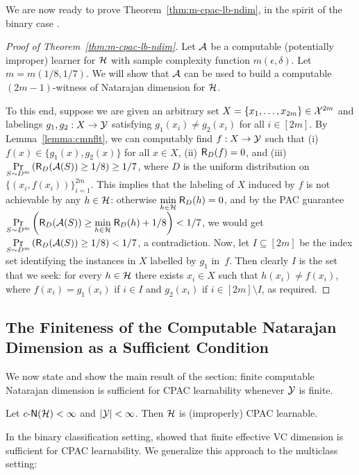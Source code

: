 \documentclass[11pt]{article}
\begin{document}
We are now ready to prove Theorem~\ref{thm:m-cpac-lb-ndim}, in the spirit of the binary case \citep{sterkenburg2022characterizations}.

\begin{proof}[Proof of Theorem~\ref{thm:m-cpac-lb-ndim}]
    Let $\mathcal{A}$ be a computable (potentially improper) learner for $\mathcal{H}$ with sample complexity function $m(\epsilon,\delta)$.
    Let $m=m(1/8,1/7)$.
    We will show that $\mathcal{A}$ can be used to build a computable $(2m-1)$-witness of Natarajan dimension for $\mathcal{H}$.
    
    To this end, suppose we are given an arbitrary set  $X=\{x_1,\dots,x_{2m}\}\in\mathcal{X}^{2m}$ and labelings $g_1,g_2:X\rightarrow\mathcal{Y}$  satisfying $g_1(x_i)\neq g_2(x_i)$ for all $i\in [2m]$.
    By Lemma~\ref{lemma:cmnflt}, we can computably find $f:X\rightarrow\mathcal{Y}$ such that (i) $f(x)\in\{g_1(x),g_2(x)\}$ for all $x\in X$, (ii) $\mathsf{R}_{D}(f)=0$, and (iii) $\underset{{S\sim D^m}}{\Pr}\left(\mathsf{R}_D(\mathcal{A}(S))\geq 1/8\right)\geq 1/7$,
    where $D$ is the uniform distribution on $\{(x_i, f(x_i))\}_{i=1}^{2m}$.
    This implies that the labeling of $X$ induced by $f$ is not achievable by any $h\in\mathcal{H}$: otherwise $\underset{h\in\mathcal{H}}{\min}\;\mathsf{R}_D(h)=0$, and by the PAC guarantee $ \underset{{S\sim D^m}}{\Pr}\left(\mathsf{R}_D(\mathcal{A}(S))\geq \underset{h\in\mathcal{H}}{\min}\;\mathsf{R}_D(h) + 1/8\right)< 1/7$,
    we would get $\underset{{S\sim D^m}}{\Pr}\left(\mathsf{R}_D(\mathcal{A}(S))\geq 1/8\right)< 1/7$,
    a contradiction.
    Now, let $I\subseteq[2m]$ be the index set identifying the instances in $X$ labelled by $g_1$ in~$f$.
    Then clearly $I$ is the set that we seek: for every $h\in\mathcal{H}$ there exists $x_i\in X$ such that $h(x_i)\neq f(x_i) $, where $f(x_i)=g_1(x_i)$ if $ i\in I$ and $g_2(x_i)$ if  $i\in [2m]\setminus I$,
    as required.
\end{proof}


\subsection{The Finiteness of the Computable Natarajan Dimension as a Sufficient Condition}
\label{sec:c-ndim-ub-finite}


We now state and show the main result of the section: finite computable Natarajan dimension is sufficient for CPAC learnability whenever $\mathcal{Y}$ is finite.

\begin{theorem}
\label{thm:c-nat-sufficient}
    Let $c\text{-}\mathsf{N}(\mathcal{H})<\infty$ and $|\mathcal{Y}|<\infty$. Then $\mathcal{H}$ is (improperly) CPAC  learnable.
\end{theorem}

In the binary classification setting, \cite{delle2023find} showed that finite effective VC dimension is sufficient for CPAC learnability. 
We generalize this approach to the multiclass setting:
\end{document}
